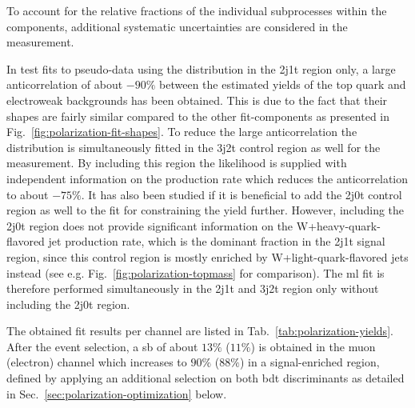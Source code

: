 To account for the relative fractions of the individual subprocesses within the components, additional systematic uncertainties are considered in the measurement. 

In test fits to pseudo-data using the \bdttch distribution in the 2j1t region only, a large anticorrelation of about $-90\%$ between the estimated yields of the top quark and electroweak backgrounds has been obtained. This is due to the fact that their \bdttch shapes are fairly similar compared to the other fit-components as presented in Fig.~\ref{fig:polarization-fit-shapes}. To reduce the large anticorrelation the \bdttch distribution is simultaneously fitted in the 3j2t control region as well for the measurement. By including this region the likelihood is supplied with independent information on the \ttbar production rate which reduces the anticorrelation to about $-75\%$. It has also been studied if it is beneficial to add the 2j0t control region as well to the fit for constraining the \wjets yield further. However, including the 2j0t region does not provide significant information on the W+heavy-quark-flavored jet production rate, which is the dominant \wjets fraction in the 2j1t signal region, since this control region is mostly enriched by W+light-quark-flavored jets instead (see e.g. Fig.~\ref{fig:polarization-topmass} for comparison). The \gls{ml} fit is therefore performed simultaneously in the 2j1t and 3j2t region only without including the 2j0t region.


The obtained fit results per channel are listed in Tab.~\ref{tab:polarization-yields}. After the event selection, a \gls{sb} of about $13\%$ ($11\%$) is obtained in the muon (electron) channel which increases to $90\%$ ($88\%$) in a signal-enriched region, defined by applying an additional selection on both \gls{bdt} discriminants as detailed in Sec.~\ref{sec:polarization-optimization} below.

